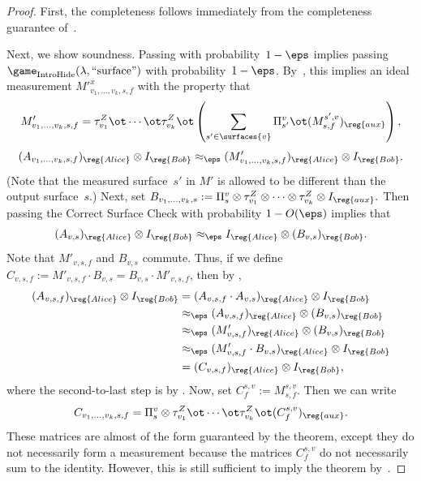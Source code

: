 \begin{proof}
First, the completeness follows immediately from
the completeness guarantee of~.

Next, we show soundness.
Passing with probability~$1-\eps$
implies passing $\game_{\mathrm{IntroHide}}(\lambda, \mathrm{``surface"})$ with probability~$1-\eps$.
By~, this implies an ideal measurement $M'^x_{v_1, \ldots, v_k, s, f}$ with
      the property that
      \begin{equation*} M'_{v_1, \dots, v_k, s, f} = 
        \tau^Z_{v_1} \ot \cdots \ot \tau^Z_{v_k} \ot \left( \sum_{s' \in \surfaces{v}} \Pi^{v}_{s'} \ot
          (M^{s', v}_{s, f})_{\reg{aux}}\right), \end{equation*}
      \[ (A_{v_1, \ldots, v_k,s, f})_{\reg{Alice}}
      		\otimes I_{\reg{Bob}} \approx_\eps (M'_{v_1, \ldots, v_k, s, f})_{\reg{Alice}} \otimes I_{\reg{Bob}}. \]
(Note that the measured surface~$s'$ in $M'$ is allowed to be different than the output surface~$s$.)
Next, set
$
B_{v_1, \ldots, v_k, s} := \Pi^v_{s} \otimes \tau^Z_{v_1} \otimes \cdots \otimes \tau^Z_{v_k} \otimes I_{\reg{aux}}.
$
Then passing the Correct Surface Check with probability $1-O(\eps)$ implies that
\begin{equation*}
(A_{v, s})_{\reg{Alice}} \otimes I_{\reg{Bob}}
\approx_{\eps} I_{\reg{Alice}} \otimes (B_{v, s})_{\reg{Bob}}.
\end{equation*}
Note that $M'_{v, s, f}$ and $B_{v, s}$ commute.
Thus, if we define $C_{v, s, f} := M'_{v, s, f} \cdot B_{v, s} = B_{v, s} \cdot M'_{v, s, f}$, then by ,
\begin{align*}
(A_{v, s, f})_{\reg{Alice}} \otimes I_{\reg{Bob}}
&= (A_{v, s, f} \cdot A_{v, s})_{\reg{Alice}} \otimes I_{\reg{Bob}}\\
&\approx_\eps (A_{v, s, f})_{\reg{Alice}} \otimes (B_{v, s})_{\reg{Bob}}\\
&\approx_\eps (M'_{v, s, f})_{\reg{Alice}} \otimes (B_{v, s})_{\reg{Bob}}\\
&\approx_\eps (M'_{v, s, f} \cdot B_{v, s})_{\reg{Alice}} \otimes I_{\reg{Bob}}\\
&= (C_{v, s, f})_{\reg{Alice}} \otimes I_{\reg{Bob}},
\end{align*}
where the second-to-last step is by .
Now, set $C^{s, v}_f := M^{s, v}_{s, f}$. Then we can write
\begin{equation*}
C_{v_1, \dots, v_k, s, f} = \Pi^v_s \otimes
	\tau^Z_{v_1} \ot \cdots \ot \tau^Z_{v_k} \ot (C^{s, v}_{f})_{\reg{aux}}.
\end{equation*}
These matrices are almost of the form guaranteed by the theorem,
except they do not necessarily form a measurement because the matrices
$C^{s, v}_f$ do not necessarily sum to the identity.
However, this is still sufficient to imply the theorem by~.
\end{proof}

